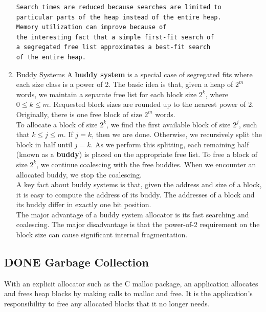 \documentclass[11pt]{article}
\begin{document}
\begin{enumerate}
\begin{verbatim}
Search times are reduced because searches are limited to 
particular parts of the heap instead of the entire heap. 
Memory utilization can improve because of 
the interesting fact that a simple first-fit search of 
a segregated free list approximates a best-fit search 
of the entire heap.
\end{verbatim}


\item Buddy Systems
\label{sec:orgfa7dc44}
A \textbf{buddy system} is a special case of segregated fits where each size class is a power of 2. The basic idea is that, given a heap of \(2^m\) words, we maintain a separate free list for each block size \(2^k\), where \(0 \le k \le m\). Requested block sizes are rounded up to the nearest power of 2. Originally, there is one free block of size \(2^m\) words.\\

To allocate a block of size \(2^k\), we find the first available block of size \(2^j\), such that \(k \le j \le m\). If \(j = k\), then we are done. Otherwise, we recursively split the block in half until \(j = k\). As we perform this splitting, each remaining half (known as a \textbf{buddy}) is placed on the appropriate free list. To free a block of size \(2^k\), we continue coalescing with the free buddies. When we encounter an allocated buddy, we stop the coalescing.\\


A key fact about buddy systems is that, given the address and size of a block, it is easy to compute the address of its buddy. The addresses of a block and its buddy differ in exactly one bit position.\\

The major advantage of a buddy system allocator is its fast searching and coalescing. The major disadvantage is that the power-of-2 requirement on the block size can cause significant internal fragmentation.\\
\end{enumerate}


\subsection{{\bfseries\sffamily DONE} Garbage Collection}
\label{sec:orgbe432c0}
With an explicit allocator such as the C malloc package, an application allocates and frees heap blocks by making calls to malloc and free. It is the application’s responsibility to free any allocated blocks that it no longer needs.\\
\end{document}
